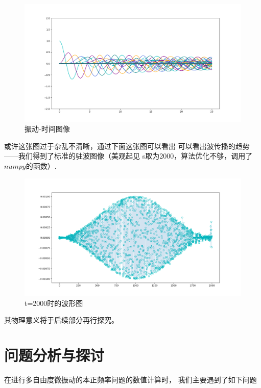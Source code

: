 \documentclass[11pt, a4paper, oneside]{ctexart}
\begin{document}
{{{\begin{figure}[H]
    \centering
    \vspace{2mm}
    \includegraphics[scale=0.4]{100_pic.png}
    \caption{振动-时间图像 }
\end{figure} 

或许这张图过于杂乱不清晰，通过下面这张图可以看出
可以看出波传播的趋势——我们得到了标准的驻波图像（美观起见
s取为2000，算法优化不够，调用了$numpy$的函数）.

\begin{figure}[H]
        
    \centering
    \vspace{2mm}
    \includegraphics[scale=0.41]{2000_.png}
    \caption{t=2000时的波形图 }
\end{figure} 
其物理意义将于后续部分再行探究。
{
    
   
        
}

\newpage
\section{问题分析与探讨}
{
    在进行多自由度微振动的本正频率问题的数值计算时，
    我们主要遇到了如下问题

}}}}
\end{document}
